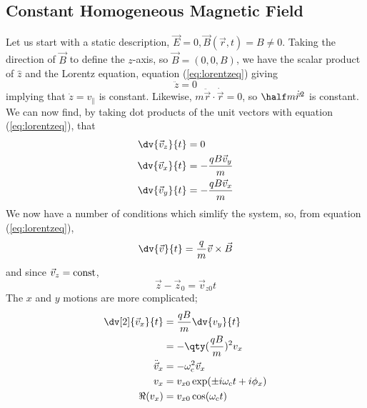 \documentclass{book}         		                %
\begin{document}
\subsection{Constant Homogeneous Magnetic Field}
\label{sec:const-homog-magn}

Let us start with a static description, $\vec{E} = 0, \vec{B}(\vec{r},
t) = B \neq 0$.  Taking the direction of $\vec{B}$ to define the
$z$-axis, so $\vec{B} = (0,0,B)$, we have the scalar product of
$\hat{z}$ and the Lorentz equation, equation (\ref{eq:lorentzeq}) giving 
\begin{equation}
  \label{eq:no-z-accel}
  \ddot{z} = 0
\end{equation}
implying that $\dot{z} = v_{\parallel}$ is constant. Likewise, $m
\ddot{\vec{r}} \cdot \dot{\vec{r}} = 0$, so $\half m \dot{\vec{r}}^2$ is
constant.  We can now find, by taking dot products of the unit vectors
with equation (\ref{eq:lorentzeq}), that
\begin{align*}
  \dv{\vec{v}_z}{t}                & = 0                                                            \\
  \dv{\vec{v}_x}{t}                & = -\frac{q B \vec{v}_y}{m}                                     \\
  \dv{\vec{v}_y}{t}                & = - \frac{q B \vec{v}_x}{m}
\end{align*}
We now have a number of conditions which simlify the system, so, from
equation (\ref{eq:lorentzeq}),
\begin{equation} 
\dv{\vec{v}}{t} = \frac{q}{m} \vec{v} \times \vec{B} 
\end{equation}
and since $\vec{v}_z = {\rm const}$,
\[ \vec{z} - \vec{z}_0 = \vec{v}_{z0}t \]
The $x$ and $y$ motions are more complicated;
\begin{align*}
  \dv[2]{\vec{v}_x}{t}             & = \frac{qB}{m} \dv{v_y}{t}                                                                      \\
                                   & = - \qty( \frac{q B}{m})^2 v_x                                                                  \\
  \ddot{\vec{v}}_x                 & = - \omega_{\rm c}^2 \vec{v}_x                                                                  \\
  v_x                              & = v_{x0} \exp( \pm i \omega_{\rm c} t + i \phi_x)                                               \\
  \Re(v_x)                         & = v_{x0} \cos( \omega_{\rm c} t)
\end{align*}
\end{document}
